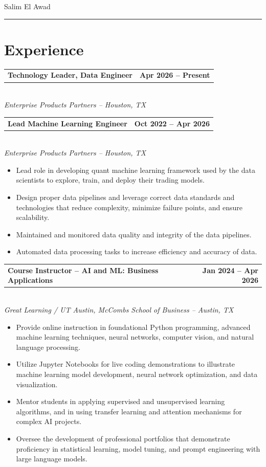 \documentclass[10pt,letterpaper]{article}
\makeatletter
\newlength{\entryindent}
\newcommand{\entry}[3]{%
  \vspace{3.5pt}%
  \hspace*{\entryindent}%
  \begin{minipage}{\dimexpr\linewidth-\entryindent\relax}
    \begin{tabular*}{\linewidth}{@{}l@{\extracolsep{\fill}}r@{}}
      \textbf{#1} & \textbf{#3}
    \end{tabular*}\\
    \textit{#2}
  \end{minipage}%
  \par
}
\newenvironment{bullets}
  {\begin{itemize}[leftmargin=0.6in,labelsep=0.09in,label=\textbullet,
                   topsep=1pt,itemsep=0pt,parsep=0pt]}
  {\end{itemize}}
\makeatother
\begin{document}
\begin{center}
  {\LARGE Salim El Awad}
\end{center}
\vspace{3pt}

\noindent{}
\vspace{2pt}
\hrule

\section*{Experience}

\entry{Technology Leader, Data Engineer}
      {Enterprise Products Partners -- Houston, TX}
      {Apr 2026 -- Present}

\entry{Lead Machine Learning Engineer}
      {Enterprise Products Partners -- Houston, TX}
      {Oct 2022 -- Apr 2026}
\begin{bullets}
  \item Lead role in developing quant machine learning framework used by the data scientists to explore, train, and deploy their trading models.
  \item Design proper data pipelines and leverage correct data standards and technologies that reduce complexity, minimize failure points, and ensure scalability.
  \item Maintained and monitored data quality and integrity of the data pipelines.
  \item Automated data processing tasks to increase efficiency and accuracy of data.
\end{bullets}

\entry{Course Instructor -- AI and ML: Business Applications}
      {Great Learning / UT Austin, McCombs School of Business -- Austin, TX}
      {Jan 2024 -- Apr 2026}
\begin{bullets}
  \item Provide online instruction in foundational Python programming, advanced machine learning techniques, neural networks, computer vision, and natural language processing.
  \item Utilize Jupyter Notebooks for live coding demonstrations to illustrate machine learning model development, neural network optimization, and data visualization.
  \item Mentor students in applying supervised and unsupervised learning algorithms, and in using transfer learning and attention mechanisms for complex AI projects.
  \item Oversee the development of professional portfolios that demonstrate proficiency in statistical learning, model tuning, and prompt engineering with large language models.
\end{bullets}
\end{document}
